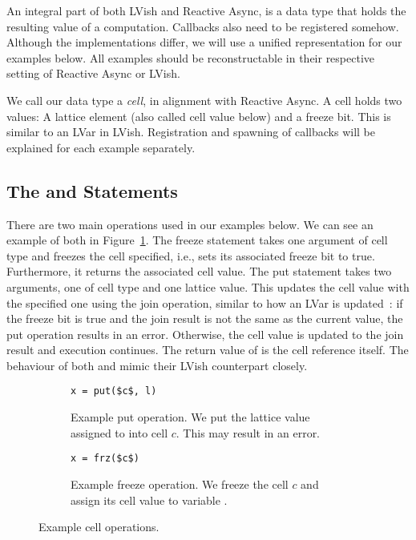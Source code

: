 An integral part of both LVish and Reactive Async, is a data type that holds 
the resulting value of a computation. Callbacks also need to be
registered somehow. Although the implementations differ, we will
use a unified representation for our examples below. All examples should be
reconstructable in their respective setting of Reactive Async or LVish.

We call our data type a \emph{cell}, in alignment with Reactive Async. A cell
holds two values: A lattice element (also called cell value below) and a freeze bit.
This is similar to an LVar in LVish. Registration and spawning of callbacks will
be explained for each example separately.

\subsection{The  and  Statements}%
\label{sub:the_put_statement}
There
are two main operations used in our examples below. We can see an example of
both in Figure~\ref{fig:ex_cell_op}. The freeze statement
 takes one argument of cell type and freezes the cell specified,
i.e., sets its associated freeze bit to true. Furthermore, it returns the
associated cell value. The put statement  takes two arguments, one
of cell type and one lattice value. This updates the cell value with the
specified one using the join operation, similar to how an LVar is
updated~\parencite{kuper2013lvars}: if the freeze bit is true and the join
result is not the same as the current value, the put operation results in an
error. Otherwise, the cell value is updated to the join result and execution
continues. The return value of  is the cell reference itself. The
behaviour of both  and  mimic their LVish counterpart
closely.


\begin{figure}
  \centering
  \begin{subfigure}[t]{0.4\textwidth}
    \begin{lstlisting}[numbers=none,mathescape=true]
x = put($c$, l)
    \end{lstlisting}
    \caption{Example put operation. We put the lattice value assigned to  into
    cell $c$. This may result in an error.}
  \end{subfigure}
  \quad
  \begin{subfigure}[t]{0.4\textwidth}
    \begin{lstlisting}[numbers=none,mathescape=true]
x = frz($c$)
    \end{lstlisting}
    \caption{Example freeze operation. We freeze the cell $c$ and assign its cell
    value to variable .}
  \end{subfigure}
  \caption{Example cell operations.}
  \label{fig:ex_cell_op}
\end{figure}

